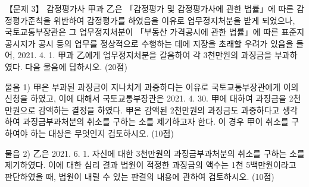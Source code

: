 \begin{longquestion}{【문제 3】}
감정평가사 甲과 乙은 「감정평가 및 감정평가사에 관한 법률」에 따른 감정평가준칙을 위반하여 감정평가를 하였음을 이유로 업무정지처분을 받게 되었으나, 국토교통부장관은 그 업무정지처분이 「부동산 가격공시에 관한 법률」에 따른 표준지공시지가 공시 등의 업무를 정상적으로 수행하는 데에 지장을 초래할 우려가 있음을 들어, 2021. 4. 1. 甲과 乙에게 업무정지처분을 갈음하여 각 3천만원의 과징금을 부과하였다. 다음 물음에 답하시오. (20점) \par
\medskip\noindent 물음 1) 甲은 부과된 과징금이 지나치게 과중하다는 이유로 국토교통부장관에게 이의신청을 하였고, 이에 대해서 국토교통부장관은 2021. 4. 30. 甲에 대하여 과징금을 2천만원으로 감액하는 결정을 하였다. 甲은 감액된 2천만원의 과징금도 과중하다고 생각하여 과징금부과처분의 취소를 구하는 소를 제기하고자 한다. 이 경우 甲이 취소를 구하여야 하는 대상은 무엇인지 검토하시오. (10점) \par
\medskip\noindent 물음 2) 乙은 2021. 6. 1. 자신에 대한 3천만원의 과징금부과처분의 취소를 구하는 소를 제기하였다. 이에 대한 심리 결과 법원이 적정한 과징금의 액수는 1천 5백만원이라고 판단하였을 때, 법원이 내릴 수 있는 판결의 내용에 관하여 검토하시오. (10점) \par
\end{longquestion}
